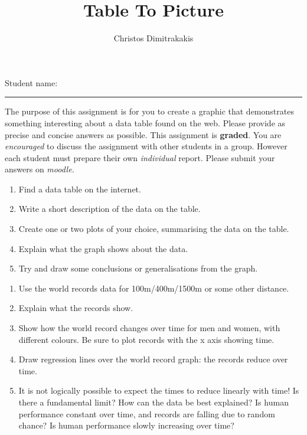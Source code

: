\documentclass[a4paper]{article}
\title{Table To Picture}
\author{Christos Dimitrakakis}
\begin{document}
\maketitle

{\Large Student name:} \vspace{0.5em} \hrule \vspace{1em}

The purpose of this assignment is for you to create a graphic that
demonstrates something interesting about a data table found on the
web.  Please provide as precise and concise answers as possible. This
assignment is \textbf{graded}. You are \emph{encouraged} to discuss
the assignment with other students in a group. However each student
must prepare their own \emph{individual} report.  Please submit your
answers on \emph{moodle.}

\begin{exercise}
  \begin{enumerate}
  \item Find a data table on the internet. 
  \item Write a short description of the data on the table.
  \item Create one or two plots of your choice, summarising the data on the table.
  \item Explain what the graph shows about the data.
  \item Try and draw some conclusions or generalisations from the graph.
  \end{enumerate}
\end{exercise}

\begin{example}
  \begin{enumerate}
  \item Use the world records data for 100m/400m/1500m or some other distance.
  \item Explain what the records show.
  \item Show how the world record changes over time for men and women,
    with different colours. Be sure to plot records with the x axis
    showing time.
  \item Draw regression lines over the world record graph: the records reduce over time.
  \item It is not logically possible to expect the times to reduce linearly with time! Is there a fundamental limit? How can the data be best explained? Is human performance constant over time, and records are falling due to random chance? Is human performance slowly increasing over time?
  \end{enumerate}
\end{example}
\end{document}
